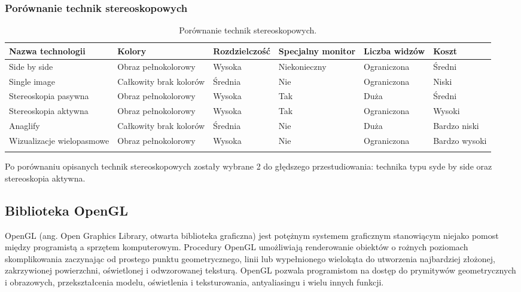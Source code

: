 \subsubsection{Porównanie technik stereoskopowych}
\begin{table}[H]
\caption{Porównanie technik stereoskopowych.}
\centering
\footnotesize
\label{tab11}
\begin{tabular}{!{\color{sapphire}\vrule width 1pt}m{0.146\textwidth}!{\color{black}\vrule width 1pt}m{0.146\textwidth}!{\color{black}\vrule width 1pt}m{0.146\textwidth}!{\color{black}\vrule width 1pt}m{0.146\textwidth}!{\color{black}\vrule width 1pt}m{0.146\textwidth}!{\color{black}\vrule width 1pt}m{0.146\textwidth}!{\color{sapphire}\vrule width 1pt}}
	\hline
	\Centering\bfseries Nazwa technologii &
	\Centering\bfseries Kolory &
	\Centering\bfseries Rozdzielczość &
	\Centering\bfseries Specjalny monitor &
	\Centering\bfseries Liczba widzów &
	\Centering\bfseries Koszt \\
	\hline
	Side by side & Obraz pełnokolorowy & Wysoka & Niekonieczny & Ograniczona & Średni \\ 
	\hline
	Single image & Całkowity brak kolorów & Średnia & Nie & Ograniczona & Niski \\ 
	\hline
	Stereoskopia pasywna & Obraz pełnokolorowy & Wysoka & Tak & Duża & Średni \\ 
	\hline
	Stereoskopia aktywna & Obraz pełnokolorowy & Wysoka & Tak & Ograniczona & Wysoki \\ 
	\hline
	Anaglify & Całkowity brak kolorów & Średnia & Nie & Duża & Bardzo niski \\ 
	\hline
	Wizualizacje wielopasmowe & Obraz pełnokolorowy & Wysoka & Nie & Ograniczona & Bardzo wysoki \\ 
	\hline
\end{tabular}
\end{table}

Po porównaniu opisanych technik stereoskopowych zostały wybrane 2 do głędszego przestudiowania: technika typu syde by side oraz stereoskopia aktywna. 

\newpage
\subsection{Biblioteka OpenGL}
OpenGL (ang. Open Graphics Library, otwarta biblioteka graficzna) jest potężnym systemem graficznym stanowiącym niejako pomost między programistą a sprzętem komputerowym. Procedury OpenGL umożliwiają renderowanie obiektów o rożnych poziomach skomplikowania zaczynając od prostego punktu geometrycznego, linii lub wypełnionego wielokąta do utworzenia najbardziej złożonej, zakrzywionej powierzchni, oświetlonej i odwzorowanej teksturą. OpenGL pozwala programistom na dostęp do prymitywów geometrycznych i obrazowych, przekształcenia modelu, oświetlenia i teksturowania, antyaliasingu i wielu innych funkcji. 


